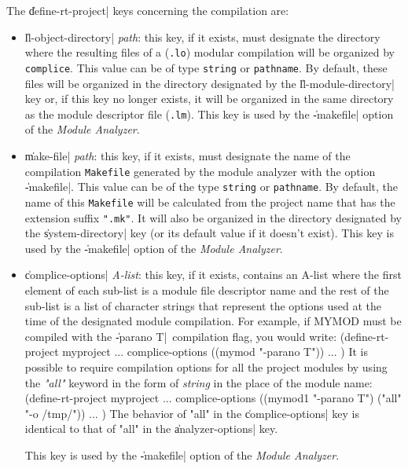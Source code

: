 The \|define-rt-project| keys concerning the compilation are:
\begin{itemize}

\item {\Large \|ll-object-directory| {\em path}}: this key, if it exists, must designate the directory where the resulting files of a ({\tt .lo}) modular compilation will be organized by {\tt
complice}.
This value can be of type {\tt string} or {\tt pathname}.  By default, these files will be organized in the directory designated by the \|ll-module-directory| key or, if this key no longer exists, it will be organized in the same directory as the module descriptor file ({\tt .lm}).  This key is used by the \|-makefile| option of the {\em Module Analyzer}.

\item {\Large \|make-file| {\em path}}: this key, if it exists, must designate the name of the compilation {\tt Makefile} generated by the module analyzer with the option \|-makefile|.  This value can be of the type {\tt string} or {\tt pathname}.
By default, the name of this {\tt Makefile} will be calculated from the project name that has the extension suffix {\tt ".mk"}.  It will also be organized in the directory designated by the \|system-directory| key (or its default value if it doesn't exist).
This key is used by the \|-makefile| option of the {\em Module Analyzer}.

\item {\Large \|complice-options| {\em A-list}}: this key, if it exists, contains an A-list where the first element of each sub-list is a module file descriptor name and the rest of the sub-list is a list of character strings that represent the options used at the time of the designated module compilation.  For example, if MYMOD must be compiled with the \|-parano T|\ compilation flag, you would write:
\BeginLL
(define-rt-project myproject
  ...
  complice-options ((mymod "-parano T"))
  ...
)
\EndLL
It is possible to require compilation options for all the project modules by using the {\em "all"} keyword in the form of {\it
string} in the place of the module name:
\BeginLL
(define-rt-project myproject
  ...
  complice-options ((mymod1 "-parano T")
                    ("all" "-o /tmp/"))
  ...
)
\EndLL
The behavior of "all" in the \|complice-options| key is identical to that of "all" in the \|analyzer-options| key.

This key is used by the \|-makefile| option of the {\em Module Analyzer}.

\end{itemize}


